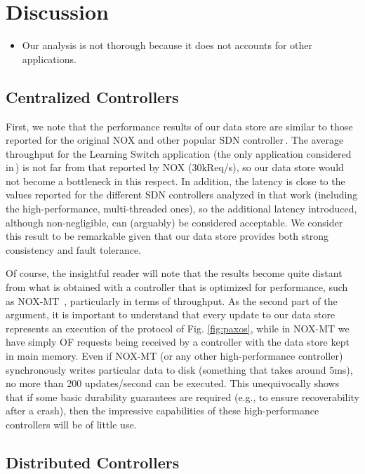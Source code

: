 \section{Discussion}
\begin{itemize}
\item Our analysis is not thorough  because it does not accounts for other applications. 
\end{itemize}

\subsection{Centralized Controllers}

First, we note that the performance results of our data store are similar to those reported for the original NOX and other popular SDN controller\,\cite{Tootoonchian:2012:CPS:2228283.2228297}.
The average throughput for the Learning Switch application (the only application considered in\,\cite{Tootoonchian:2012:CPS:2228283.2228297}) is not far from that reported by NOX (30kReq/s), so our data store would not become a bottleneck in this respect.
In addition, the latency is close to the values reported for the different SDN controllers analyzed in that work (including the high-performance, multi-threaded ones), so the additional latency introduced, although non-negligible, can (arguably) be considered acceptable.
We consider this result to be remarkable given that our data store provides both strong consistency and fault tolerance.

Of course, the insightful reader will note that the results become quite distant from what is obtained with a controller that is optimized for performance, such as NOX-MT~\cite{Tootoonchian:2012:CPS:2228283.2228297}, particularly in terms of throughput.
As the second part of the argument, it is important to understand that every update to our data store represents an execution of the protocol of Fig. \ref{fig:paxos}, while in NOX-MT we have simply OF requests being received by a controller with the data store kept in main memory.
Even if NOX-MT (or any other high-performance controller) synchronously writes particular data to disk (something that takes around 5ms), no more than 200 updates/second can be executed.
This unequivocally shows that if some basic durability guarantees are required (e.g., to ensure recoverability after a crash), then the impressive capabilities of these high-performance controllers will be of little use.

\subsection{Distributed Controllers}

